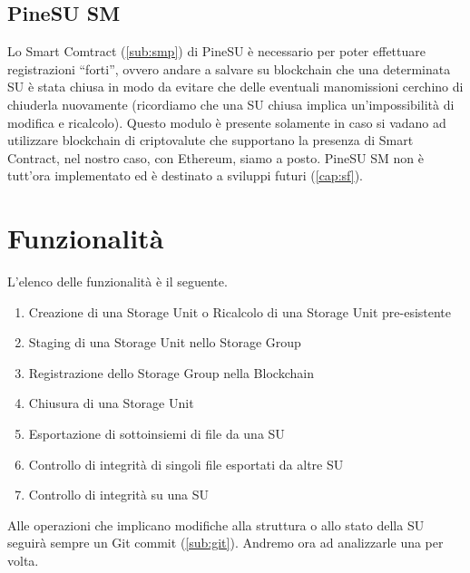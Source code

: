 \subsection{PineSU SM}
\label{sub:sm}
Lo Smart Comtract (\autoref{sub:smp}) di PineSU è necessario
per poter effettuare registrazioni “forti”, ovvero andare a salvare su blockchain
che una determinata SU è stata chiusa in modo da evitare che delle eventuali manomissioni
cerchino di chiuderla nuovamente (ricordiamo che una SU chiusa implica un’impossibilità di modifica e ricalcolo).
Questo modulo è presente solamente in caso si vadano ad utilizzare blockchain di criptovalute che
supportano la presenza di Smart Contract, nel nostro caso, con Ethereum, siamo a posto.
PineSU SM non è tutt’ora implementato ed è destinato a sviluppi futuri (\autoref{cap:sf}).

\newpage

\section{Funzionalità}

L’elenco delle funzionalità è il seguente.

\begin{enumerate}
    \item Creazione di una Storage Unit o Ricalcolo di una Storage Unit pre-esistente
    \item Staging di una Storage Unit nello Storage Group
    \item Registrazione dello Storage Group nella Blockchain
    \item Chiusura di una Storage Unit
    \item Esportazione di sottoinsiemi di file da una SU
    \item Controllo di integrità di singoli file esportati da altre SU
    \item Controllo di integrità su una SU
\end{enumerate}

Alle operazioni che implicano modifiche alla struttura o allo stato della SU seguirà sempre un Git \textsf{commit} (\autoref{sub:git}).
Andremo ora ad analizzarle una per volta.

